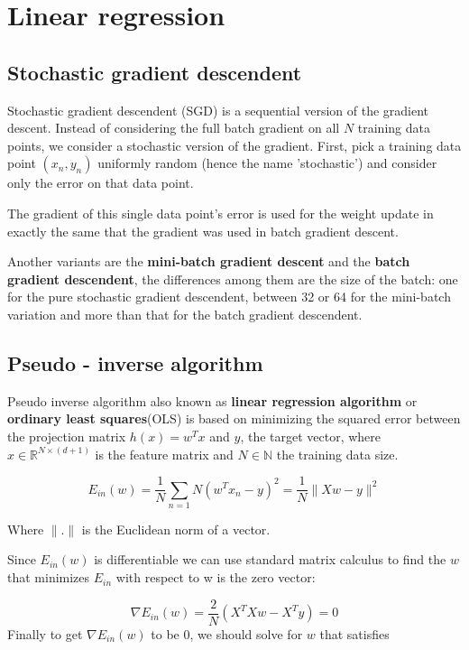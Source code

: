 
\section{ Linear regression }
\subsection{Stochastic gradient descendent}


Stochastic gradient descendent (SGD) is a sequential version of the gradient descent. Instead of considering the full batch gradient on all $N$
training data points, we consider a stochastic version of the gradient. First, pick a training data point $(x_n, y_n)$ uniformly random
(hence the name 'stochastic') and consider only the error on that data point.  \cite{LFD}

The gradient of this single data point's error is used for the weight update in exactly the same that the gradient was used in batch gradient descent.

Another variants are the \textbf{mini-batch gradient descent} and the \textbf{batch gradient descendent}, the differences among them are the size of the batch: one for the pure stochastic gradient descendent, between 32 or 64 for the mini-batch variation and more than that for the batch gradient descendent.


\subsection{Pseudo - inverse algorithm}
Pseudo inverse algorithm also known as \textbf{linear regression algorithm} or \textbf{ordinary least squares}(OLS) is based on minimizing the squared error between the 
projection matrix $h(x) = w^T x$ and $y$, the target vector, where $x \in \mathbb R^{N \times (d+1)}$ is the feature matrix and
$N \in \mathbb N$ the training data size.   

\begin{equation*}
  E_{in}(w) = \frac{1}{N} \sum_{n=1}{N} (w^T x_n - y)^2 
  = \frac{1}{N} \| Xw -y \|^2 
\end{equation*}

Where $\|.\|$ is the Euclidean norm of a vector.

Since $E_{in}(w)$ is differentiable we can use standard matrix calculus to find the $w$ that minimizes  $E_{in}$ with respect to w is the zero vector:

$$\nabla E_{in}(w) = \frac{2}{N}(X^TXw - X^T y) =0$$
Finally to get $\nabla  E_{in}(w)$ to be $0$, we should solve for $w$ that satisfies

